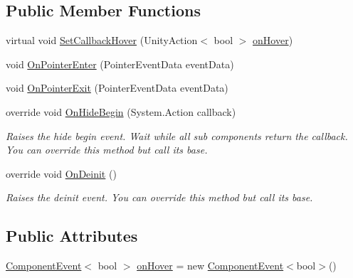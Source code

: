 \subsection*{Public Member Functions}
\begin{DoxyCompactItemize}
\item 
virtual void \hyperlink{class_unity_engine_1_1_u_i_1_1_windows_1_1_components_1_1_button_hover_component_ad62e3aa546bc15e1908bfb54b67846f4}{Set\+Callback\+Hover} (Unity\+Action$<$ bool $>$ \hyperlink{class_unity_engine_1_1_u_i_1_1_windows_1_1_components_1_1_button_hover_component_a0e4ba2a51401a13e0feb2c3175d3d5f2}{on\+Hover})
\item 
void \hyperlink{class_unity_engine_1_1_u_i_1_1_windows_1_1_components_1_1_button_hover_component_a36783c342cb2680fb7cce7baff3e0f14}{On\+Pointer\+Enter} (Pointer\+Event\+Data event\+Data)
\item 
void \hyperlink{class_unity_engine_1_1_u_i_1_1_windows_1_1_components_1_1_button_hover_component_a0edcef4fd6e4a0338ce5d01458d879aa}{On\+Pointer\+Exit} (Pointer\+Event\+Data event\+Data)
\item 
override void \hyperlink{class_unity_engine_1_1_u_i_1_1_windows_1_1_components_1_1_button_hover_component_ac57b714951ea3676e216f61f1f86e6b1}{On\+Hide\+Begin} (System.\+Action callback)
\begin{DoxyCompactList}\small\item\em Raises the hide begin event. Wait while all sub components return the callback. You can override this method but call it\textquotesingle{}s base. \end{DoxyCompactList}\item 
override void \hyperlink{class_unity_engine_1_1_u_i_1_1_windows_1_1_components_1_1_button_hover_component_a998b7123aa963e0f17f0c6748554da76}{On\+Deinit} ()
\begin{DoxyCompactList}\small\item\em Raises the deinit event. You can override this method but call it\textquotesingle{}s base. \end{DoxyCompactList}\end{DoxyCompactItemize}
\subsection*{Public Attributes}
\begin{DoxyCompactItemize}
\item 
\hyperlink{class_unity_engine_1_1_u_i_1_1_windows_1_1_components_1_1_events_1_1_component_event}{Component\+Event}$<$ bool $>$ \hyperlink{class_unity_engine_1_1_u_i_1_1_windows_1_1_components_1_1_button_hover_component_a0e4ba2a51401a13e0feb2c3175d3d5f2}{on\+Hover} = new \hyperlink{class_unity_engine_1_1_u_i_1_1_windows_1_1_components_1_1_events_1_1_component_event}{Component\+Event}$<$bool$>$()
\end{DoxyCompactItemize}
